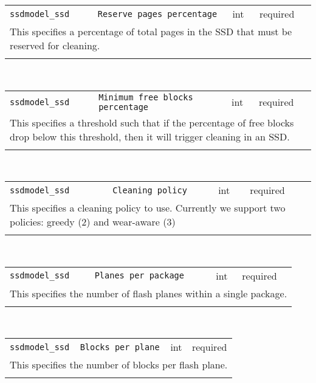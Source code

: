 \noindent 
\begin{tabular}{|p{\lpmodwidth}|p{\lpnamewidth}|p{0.5in}|p{0.5in}|}
\cline{1-4}
\texttt{ssdmodel\_ssd} & \texttt{Reserve pages percentage} & int & required \\ 
\cline{1-4}
\multicolumn{4}{|p{6in}|}{
This specifies a percentage of total pages in the SSD that must be
reserved for cleaning.
}\\ 
\cline{1-4}
\multicolumn{4}{p{5in}}{}\\
\end{tabular}\\ 
\noindent 
\begin{tabular}{|p{\lpmodwidth}|p{\lpnamewidth}|p{0.5in}|p{0.5in}|}
\cline{1-4}
\texttt{ssdmodel\_ssd} & \texttt{Minimum free blocks percentage} & int & required \\ 
\cline{1-4}
\multicolumn{4}{|p{6in}|}{
This specifies a threshold such that if the percentage of free blocks
drop below this threshold, then it will trigger cleaning in an SSD.
}\\ 
\cline{1-4}
\multicolumn{4}{p{5in}}{}\\
\end{tabular}\\ 
\noindent 
\begin{tabular}{|p{\lpmodwidth}|p{\lpnamewidth}|p{0.5in}|p{0.5in}|}
\cline{1-4}
\texttt{ssdmodel\_ssd} & \texttt{Cleaning policy} & int & required \\ 
\cline{1-4}
\multicolumn{4}{|p{6in}|}{
This specifies a cleaning policy to use. Currently we support
two policies: greedy (2) and wear-aware (3)
}\\ 
\cline{1-4}
\multicolumn{4}{p{5in}}{}\\
\end{tabular}\\ 
\noindent 
\begin{tabular}{|p{\lpmodwidth}|p{\lpnamewidth}|p{0.5in}|p{0.5in}|}
\cline{1-4}
\texttt{ssdmodel\_ssd} & \texttt{Planes per package} & int & required \\ 
\cline{1-4}
\multicolumn{4}{|p{6in}|}{
This specifies the number of flash planes within a single package.
}\\ 
\cline{1-4}
\multicolumn{4}{p{5in}}{}\\
\end{tabular}\\ 
\noindent 
\begin{tabular}{|p{\lpmodwidth}|p{\lpnamewidth}|p{0.5in}|p{0.5in}|}
\cline{1-4}
\texttt{ssdmodel\_ssd} & \texttt{Blocks per plane} & int & required \\ 
\cline{1-4}
\multicolumn{4}{|p{6in}|}{
This specifies the number of blocks per flash plane.
}\\ 
\cline{1-4}
\multicolumn{4}{p{5in}}{}\\
\end{tabular}\\ 

